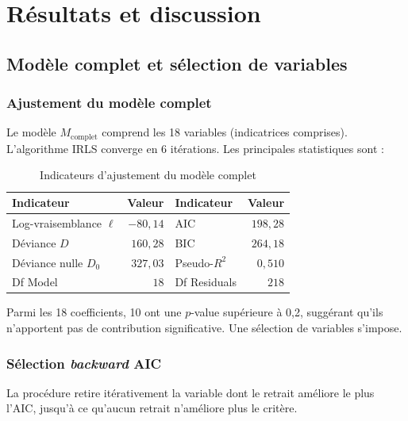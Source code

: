 \documentclass[11pt,a4paper,twoside]{report}
\theoremstyle{definition}
\begin{document}
\chapter{Résultats et discussion}

\section{Modèle complet et sélection de variables}

\subsection{Ajustement du modèle complet}

Le modèle $M_{\text{complet}}$ comprend les 18 variables (indicatrices
comprises). L'algorithme IRLS converge en 6 itérations. Les principales
statistiques sont :

\begin{table}[H]
\centering
\caption{Indicateurs d'ajustement du modèle complet}
\label{tab:complet}
\begin{tabular}{lrlr}
\toprule
Indicateur & Valeur & Indicateur & Valeur \\
\midrule
Log-vraisemblance $\ell$ & $-80{,}14$ & AIC  & $198{,}28$ \\
Déviance $D$              & $160{,}28$ & BIC  & $264{,}18$ \\
Déviance nulle $D_0$      & $327{,}03$ & Pseudo-$R^2$ & $0{,}510$ \\
Df Model                  & $18$       & Df Residuals & $218$ \\
\bottomrule
\end{tabular}
\end{table}

Parmi les 18 coefficients, 10 ont une $p$-value supérieure à 0,2,
suggérant qu'ils n'apportent pas de contribution significative. Une
sélection de variables s'impose.

\subsection{Sélection \emph{backward} AIC}

La procédure retire itérativement la variable dont le retrait améliore
le plus l'AIC, jusqu'à ce qu'aucun retrait n'améliore plus le critère.
\end{document}
